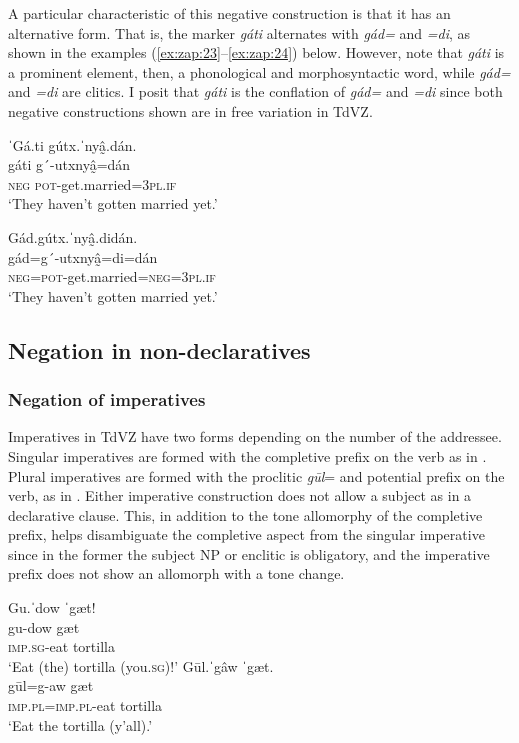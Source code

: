 \documentclass[output=paper,colorlinks=true, citecolor=brown]{langscibook}
\begin{document}
A particular characteristic of this negative construction is that it has an alternative form. That is, the marker \textit{gáti} alternates with \textit{gád=} and \textit{=di}, as shown in the examples (\ref{ex:zap:23}--\ref{ex:zap:24}) below. However, note that \textit{gáti} is a prominent element, then, a phonological and morphosyntactic word, while \textit{gád=} and \textit{=di} are clitics. I posit that \textit{gáti} is the conflation of \textit{gád=} and \textit{=di} since both negative constructions shown are in free variation in TdVZ.

\ea\label{ex:zap:23} 
    \glll ˈGá.ti gútx.ˈnyâ̰.dán.\\ 
          gáti g´-utxnyâ̰=dán\\
          \textsc{neg} \textsc{pot}{}-get.married=\textsc{3pl.if}\\
    \glt ‘They haven’t gotten married yet.’
\z 

\ea\label{ex:zap:24} 
    \glll Gád.gútx.ˈnyâ̰.didán.\\ 
          gád=g´-utxnyâ̰=di=dán\\
          \textsc{neg}=\textsc{pot}{}-get.married=\textsc{neg=3pl.if}\\
    \glt‘They haven’t gotten married yet.’ 
\z 

\subsection{Negation in non-declaratives}\label{sec:zap:2.2}
\subsubsection{Negation of imperatives}\label{sec:zap:2.2.1}

Imperatives in TdVZ have two forms depending on the number of the addressee. Singular imperatives are formed with the completive prefix on the verb as in . Plural imperatives are formed with the proclitic \textit{gūl}= and potential prefix on the verb, as in . Either imperative construction does not allow a subject as in a declarative clause. This, in addition to the tone allomorphy of the completive prefix, helps disambiguate the completive aspect from the singular imperative since in the former the subject NP or enclitic is obligatory, and the imperative prefix does not show an allomorph with a tone change.

\ea\label{ex:zap:25}
    \ea\label{ex:zap:25a}
        \glll Gu.ˈdow ˈgæt! \\ 
               gu-dow gæt\\
               \textsc{imp.sg}{}-eat tortilla\\
        \glt  ‘Eat (the) tortilla (you.\textsc{sg})!’
    \ex\label{ex:zap:25b}
        \glll  Gūl.ˈgâw ˈgæt.\\
              gūl=g-aw gæt\\
               \textsc{imp.pl}=\textsc{imp.pl}{}-eat tortilla\\
        \glt ‘Eat the tortilla (y’all).’
    \z
\z  
\end{document}
